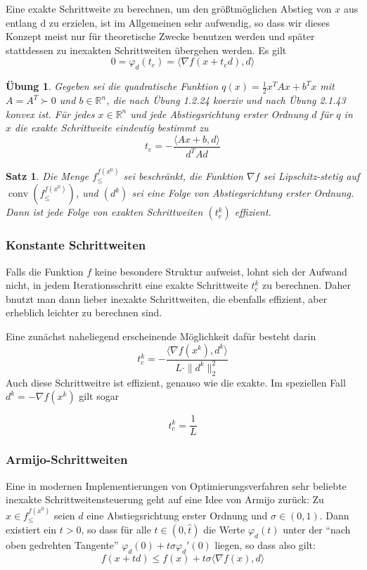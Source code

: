 \documentclass[11pt]{scrreprt}
\newcounter{thm}
\theoremstyle{thmstyle}
\numberwithin{thm}{section}
\newtheorem{satz}[thm]{Satz}
\newtheorem{uebung}[thm]{Übung}
\begin{document}
Eine exakte Schrittweite zu berechnen, um den größtmöglichen Abstieg von $x$ aus entlang d zu erzielen, ist im Allgemeinen sehr aufwendig, so dass wir dieses Konzept meist nur für theoretische Zwecke benutzen werden und später stattdessen zu inexakten Schrittweiten übergehen werden.  Es gilt
	$$ 0 = \varphi_d(t_e) = \langle \nabla f(x + t_ed), d \rangle $$

\begin{uebung}
	Gegeben sei die quadratische Funktion $q(x) = \frac{1}{2} x^T A x + b^T x$ mit $A = A^T \succ 0$ und $b \in \mathbb{R}^n$, die nach Übung 1.2.24 koerziv und nach Übung 2.1.43 konvex ist. Für 
	jedes $x \in \mathbb{R}^n$ und jede Abstiegsrichtung erster Ordnung $d$ 
	für $q$ in $x$ die exakte Schrittweite eindeutig bestimmt zu
	$$ t_e = - \frac{\langle Ax + b, d \rangle}{d^T A d} $$
\end{uebung}

\begin{satz}
	Die Menge $f_{\leq}^{f(x^0)}$ sei beschränkt, die Funktion $\nabla f$ sei Lipschitz-stetig auf $\operatorname{conv}(f_{\leq}^{f(x^0)})$, und $(d^k)$ sei eine Folge von Abstiegsrichtung erster Ordnung. Dann ist jede Folge von exakten Schrittweiten $(t_e^k)$ effizient.
\end{satz}

\subsubsection*{Konstante Schrittweiten}

Falls die Funktion $f$ keine besondere Struktur aufweist, lohnt sich der Aufwand nicht, in jedem Iterationsschritt eine exakte Schrittweite $t_e^k$ zu berechnen. Daher bnutzt man dann lieber inexakte Schrittweiten, die ebenfalls effizient, aber erheblich leichter zu berechnen sind. ~\bigskip

Eine zunächst naheliegend erscheinende Möglichkeit dafür besteht darin 
 $$ t_c^k = - \frac{\langle \nabla f(x^k), d^k \rangle}{L \cdot \|d^k \|_2^2} $$
Auch diese Schrittweitre ist effizient, genauso wie die exakte. Im speziellen Fall $d^k = -\nabla f (x^k)$ gilt sogar

	$$ t_c^k = \frac{1}{L} $$
	

\subsubsection*{Armijo-Schrittweiten}
	
Eine in modernen Implementierungen von Optimierungsverfahren sehr beliebte inexakte Schrittweitensteuerung geht auf eine Idee von Armijo zurück: Zu $x \in f_{\leq}^{f(x^0)}$ seien $d$ eine Abstiegsrichtung erster Ordnung und $\sigma \in (0,1)$. Dann existiert ein $t > 0$, so dass für alle $t \in (0, \hat{t})$ die Werte $\varphi_d(t)$ unter der \enquote{nach oben gedrehten Tangente} $\varphi_d(0) + t \sigma \varphi_d'(0)$ liegen, so dass also gilt:	
	$$ f(x + td) \leq f(x) + t \sigma \langle \nabla f(x), d \rangle $$
	
\end{document}
